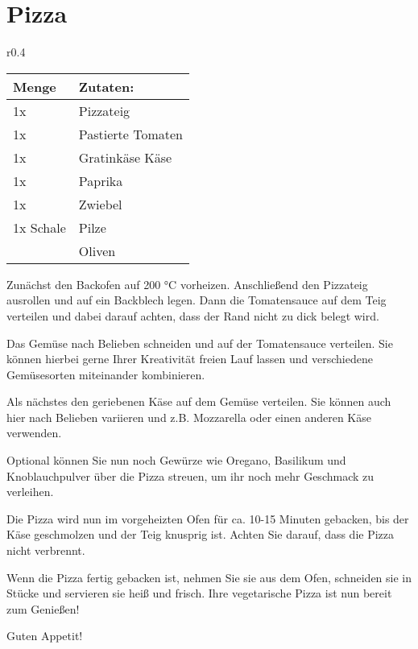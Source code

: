 \documentclass[../../book.tex]{subfiles}
\begin{document}
\section{Pizza}
\begin{wraptable}{r}{0.4\textwidth}
    \centering
    \begin{tabularx}{0.39\textwidth}{|l|X|}
        \hline
        Menge & Zutaten: \\
        \hline
        1x & Pizzateig \\
        \hline
        1x & Pastierte Tomaten \\
        \hline
        1x & Gratinkäse Käse\\
        \hline
        1x & Paprika\\
        \hline
        1x & Zwiebel\\
        \hline
        1x Schale & Pilze\\
        \hline
        & Oliven\\
        \hline
        

    \end{tabularx}
\end{wraptable}
Zunächst den Backofen auf 200 °C vorheizen. Anschließend den Pizzateig ausrollen und auf ein Backblech legen. Dann die Tomatensauce auf dem Teig verteilen und dabei darauf achten, dass der Rand nicht zu dick belegt wird.

Das Gemüse nach Belieben schneiden und auf der Tomatensauce verteilen. Sie können hierbei gerne Ihrer Kreativität freien Lauf lassen und verschiedene Gemüsesorten miteinander kombinieren.

Als nächstes den geriebenen Käse auf dem Gemüse verteilen. Sie können auch hier nach Belieben variieren und z.B. Mozzarella oder einen anderen Käse verwenden.

Optional können Sie nun noch Gewürze wie Oregano, Basilikum und Knoblauchpulver über die Pizza streuen, um ihr noch mehr Geschmack zu verleihen.

Die Pizza wird nun im vorgeheizten Ofen für ca. 10-15 Minuten gebacken, bis der Käse geschmolzen und der Teig knusprig ist. Achten Sie darauf, dass die Pizza nicht verbrennt.

Wenn die Pizza fertig gebacken ist, nehmen Sie sie aus dem Ofen, schneiden sie in Stücke und servieren sie heiß und frisch. Ihre vegetarische Pizza ist nun bereit zum Genießen!

Guten Appetit!
\newpage
\end{document}
